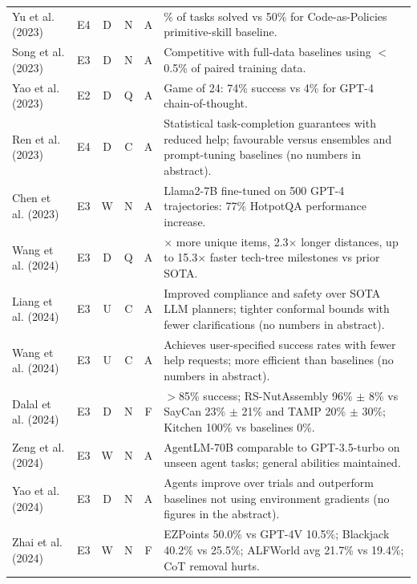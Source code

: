 \documentclass[10pt,a4paper]{article}
\begin{document}
\begin{longtable}{@{}>{\raggedright\arraybackslash}p{4.0cm}cccc>{\raggedright\arraybackslash}p{7.6cm}@{}}
Yu et al. (2023)~\cite{Yu2023} & E4 & D & N & A & 90\% of tasks solved vs 50\% for Code-as-Policies primitive-skill baseline. \\
Song et al. (2023)~\cite{Song2023} & E3 & D & N & A & Competitive with full-data baselines using $<$0.5\% of paired training data. \\
Yao et al. (2023)~\cite{Yao2023b} & E2 & D & Q & A & Game of 24: 74\% success vs 4\% for GPT-4 chain-of-thought. \\
Ren et al. (2023)~\cite{Ren2023} & E4 & D & C & A & Statistical task-completion guarantees with reduced help; favourable versus ensembles and prompt-tuning baselines (no numbers in abstract). \\
Chen et al. (2023)~\cite{Chen2023b} & E3 & W & N & A & Llama2-7B fine-tuned on 500 GPT-4 trajectories: 77\% HotpotQA performance increase. \\
Wang et al. (2024)~\cite{Wang2024a} & E3 & D & Q & A & 3.3$\times$ more unique items, 2.3$\times$ longer distances, up to 15.3$\times$ faster tech-tree milestones vs prior SOTA. \\
Liang et al. (2024)~\cite{Liang2024} & E3 & U & C & A & Improved compliance and safety over SOTA LLM planners; tighter conformal bounds with fewer clarifications (no numbers in abstract). \\
Wang et al. (2024)~\cite{Wang2024c} & E3 & U & C & A & Achieves user-specified success rates with fewer help requests; more efficient than baselines (no numbers in abstract). \\
Dalal et al. (2024)~\cite{Dalal2024} & E3 & D & N & F & $>$85\% success; RS-NutAssembly 96\% $\pm$ 8\% vs SayCan 23\% $\pm$ 21\% and TAMP 20\% $\pm$ 30\%; Kitchen 100\% vs baselines 0\%. \\
Zeng et al. (2024)~\cite{Zeng2024} & E3 & W & N & A & AgentLM-70B comparable to GPT-3.5-turbo on unseen agent tasks; general abilities maintained. \\
Yao et al. (2024)~\cite{Yao2024} & E3 & D & N & A & Agents improve over trials and outperform baselines not using environment gradients (no figures in the abstract). \\
Zhai et al. (2024)~\cite{Zhai2024} & E3 & W & N & F & EZPoints 50.0\% vs GPT-4V 10.5\%; Blackjack 40.2\% vs 25.5\%; ALFWorld avg 21.7\% vs 19.4\%; CoT removal hurts. \\
\bottomrule\end{longtable}
\end{document}
